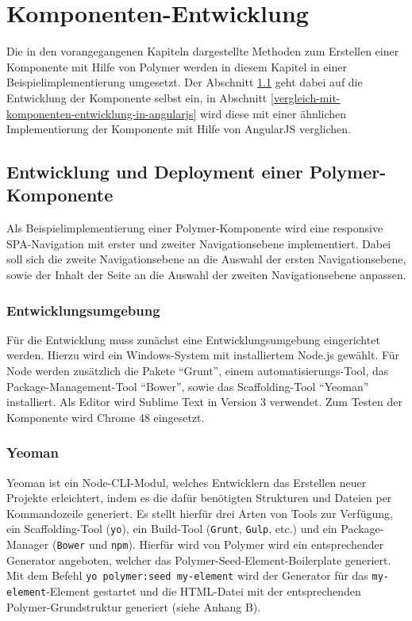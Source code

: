 \chapter{Komponenten-Entwicklung}\label{komponenten-entwicklung}

Die in den vorangegangenen Kapiteln dargestellte Methoden zum Erstellen einer Komponente mit Hilfe von Polymer werden in diesem Kapitel in einer Beispielimplementierung umgesetzt. Der Abschnitt \ref{entwicklung-und-deployment-einer-polymer-komponente} geht dabei auf die Entwicklung der Komponente selbst ein, in Abschnitt \ref{vergleich-mit-komponenten-entwicklung-in-angularjs} wird diese mit einer ähnlichen Implementierung der Komponente mit Hilfe von AngularJS verglichen.


\section{Entwicklung und Deployment einer Polymer-Komponente}\label{entwicklung-und-deployment-einer-polymer-komponente}

Als Beispielimplementierung einer Polymer-Komponente wird eine responsive \ac{SPA}-Navigation mit erster und zweiter Navigationsebene implementiert. Dabei soll sich die zweite Navigationsebene an die Auswahl der ersten Navigationsebene, sowie der Inhalt der Seite an die Auswahl der zweiten Navigationsebene anpassen.


\subsection{Entwicklungsumgebung}\label{entwicklungsumgebung}

Für die Entwicklung muss zunächst eine Entwicklungsumgebung eingerichtet werden. Hierzu wird ein Windows-System mit installiertem Node.js gewählt. Für Node werden zusätzlich die Pakete ``Grunt'', einem automatisierungs-Tool, das Package-Management-Tool ``Bower'', sowie das Scaffolding-Tool ``Yeoman'' installiert. Als Editor wird Sublime Text in Version 3 verwendet. Zum Testen der Komponente wird Chrome 48 eingesetzt.


\subsection{Yeoman}\label{yeoman}

Yeoman \cite{citeulike:13916358} ist ein Node-\ac{CLI}-Modul, welches Entwicklern das Erstellen neuer Projekte erleichtert, indem es die dafür benötigten Strukturen und Dateien per Kommandozeile generiert. Es stellt hierfür drei Arten von Tools zur Verfügung, ein Scaffolding-Tool (\texttt{yo}), ein Build-Tool (\texttt{Grunt}, \texttt{Gulp}, etc.) und ein Package-Manager (\texttt{Bower} und \texttt{npm}). Hierfür wird von Polymer wird ein entsprechender Generator angeboten, welcher das Polymer-Seed-Element-Boilerplate generiert. Mit dem Befehl \texttt{yo\ polymer:seed\ my-element} wird der Generator für das \texttt{my-element}-Element gestartet und die \ac{HTML}-Datei mit der entsprechenden Polymer-Grundstruktur generiert (siehe Anhang B).


